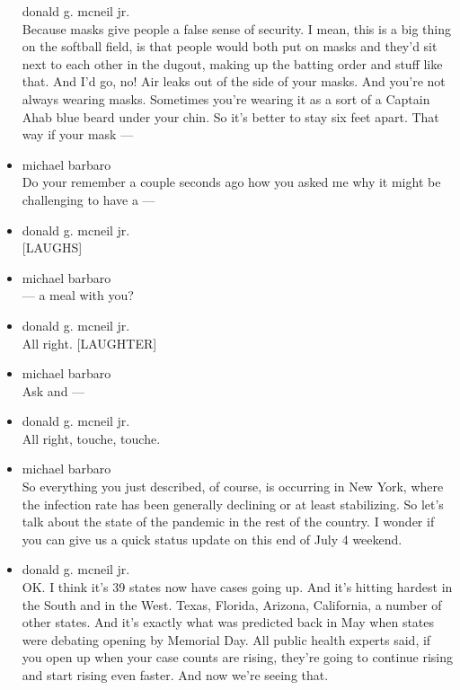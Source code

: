 \begin{itemize}
  donald g. mcneil jr.\\
  Because masks give people a false sense of security. I mean, this is a
  big thing on the softball field, is that people would both put on
  masks and they'd sit next to each other in the dugout, making up the
  batting order and stuff like that. And I'd go, no! Air leaks out of
  the side of your masks. And you're not always wearing masks. Sometimes
  you're wearing it as a sort of a Captain Ahab blue beard under your
  chin. So it's better to stay six feet apart. That way if your mask ---
\item
  michael barbaro\\
  Do your remember a couple seconds ago how you asked me why it might be
  challenging to have a ---
\item
  donald g. mcneil jr.\\
  {[}LAUGHS{]}
\item
  michael barbaro\\
  --- a meal with you?
\item
  donald g. mcneil jr.\\
  All right. {[}LAUGHTER{]}
\item
  michael barbaro\\
  Ask and ---
\item
  donald g. mcneil jr.\\
  All right, touche, touche.
\item
  michael barbaro\\
  So everything you just described, of course, is occurring in New York,
  where the infection rate has been generally declining or at least
  stabilizing. So let's talk about the state of the pandemic in the rest
  of the country. I wonder if you can give us a quick status update on
  this end of July 4 weekend.
\item
  donald g. mcneil jr.\\
  OK. I think it's 39 states now have cases going up. And it's hitting
  hardest in the South and in the West. Texas, Florida, Arizona,
  California, a number of other states. And it's exactly what was
  predicted back in May when states were debating opening by Memorial
  Day. All public health experts said, if you open up when your case
  counts are rising, they're going to continue rising and start rising
  even faster. And now we're seeing that.


\end{itemize}
